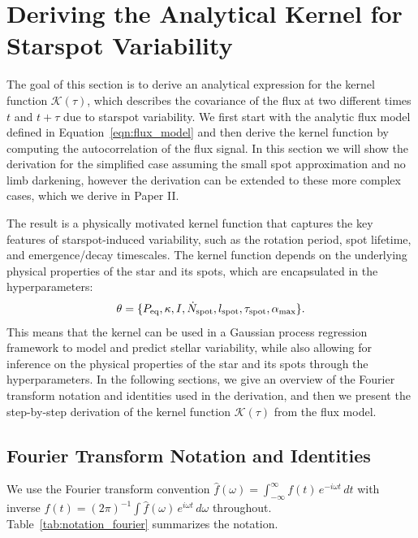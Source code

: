 \documentclass[preprint]{aastex702}
\newcommand{\FT}[1]{\hat{#1}}
\begin{document}
\vspace{\baselineskip}
\section{Deriving the Analytical Kernel for Starspot Variability} \label{sec:kernel_derivation}

The goal of this section is to derive an analytical expression for the kernel function $\mathcal{K}(\tau)$, which describes the covariance of the flux at two different times $t$ and $t+\tau$ due to starspot variability. We first start with the analytic flux model defined in Equation~\ref{eqn:flux_model} and then derive the kernel function by computing the autocorrelation of the flux signal. In this section we will show the derivation for the simplified case assuming the small spot approximation and no limb darkening, however the derivation can be extended to these more complex cases, which we derive in Paper II.

The result is a physically motivated kernel function that captures the key features of starspot-induced variability, such as the rotation period, spot lifetime, and emergence/decay timescales. The kernel function depends on the underlying physical properties of the star and its spots, which are encapsulated in the hyperparameters:
\[
\theta = \{P_{\rm eq}, \kappa, I, \dot{N}_{\rm spot}, l_{\rm spot}, \tau_{\rm spot}, \alpha_{\rm max} \}.
\]
This means that the kernel can be used in a Gaussian process regression framework to model and predict stellar variability, while also allowing for inference on the physical properties of the star and its spots through the hyperparameters. In the following sections, we give an overview of the Fourier transform notation and identities used in the derivation, and then we present the step-by-step derivation of the kernel function $\mathcal{K}(\tau)$ from the flux model. 

\subsection{Fourier Transform Notation and Identities}

We use the Fourier transform convention $\FT{f}(\omega) = \int_{-\infty}^{\infty} f(t)\,e^{-i\omega t}\,dt$ with inverse $f(t) = (2\pi)^{-1}\int \FT{f}(\omega)\,e^{i\omega t}\,d\omega$ throughout. Table~\ref{tab:notation_fourier} summarizes the notation.
\end{document}
